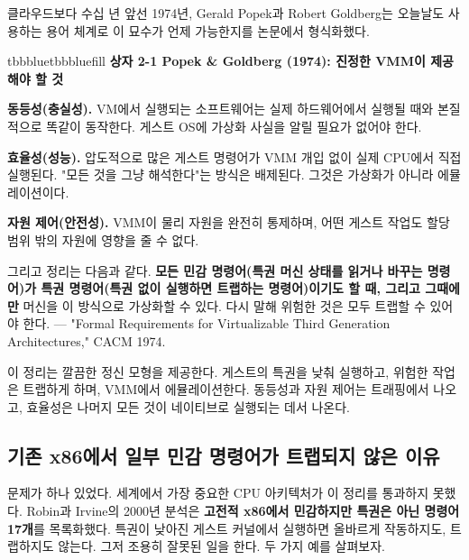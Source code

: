 클라우드보다 수십 년 앞선 1974년, Gerald Popek과 Robert Goldberg는 오늘날도 사용하는 용어 체계로 이 묘수가 언제 가능한지를 논문에서 형식화했다.

\begin{calloutbox}{tbbblue}{tbbbluefill}
{\normalsize\bfseries\color{tbbblue}상자 2-1  Popek \& Goldberg (1974): 진정한 VMM이 제공해야 할 것}\par\vspace{3pt}
\begin{tbbitemize}
  \item \textbf{동등성(충실성).} VM에서 실행되는 소프트웨어는 실제 하드웨어에서 실행될 때와 본질적으로 똑같이 동작한다. 게스트 OS에 가상화 사실을 알릴 필요가 없어야 한다.
  \item \textbf{효율성(성능).} 압도적으로 많은 게스트 명령어가 VMM 개입 없이 실제 CPU에서 직접 실행된다. "모든 것을 그냥 해석한다"는 방식은 배제된다. 그것은 가상화가 아니라 에뮬레이션이다.
  \item \textbf{자원 제어(안전성).} VMM이 물리 자원을 완전히 통제하며, 어떤 게스트 작업도 할당 범위 밖의 자원에 영향을 줄 수 없다.
\end{tbbitemize}

그리고 정리는 다음과 같다. \textbf{모든 민감 명령어(특권 머신 상태를 읽거나 바꾸는 명령어)가 특권 명령어(특권 없이 실행하면 트랩하는 명령어)이기도 할 때, 그리고 그때에만} 머신을 이 방식으로 가상화할 수 있다. 다시 말해 위험한 것은 모두 트랩할 수 있어야 한다. — "Formal Requirements for Virtualizable Third Generation Architectures," CACM 1974.
\end{calloutbox}

\vspace{3.0pt}

이 정리는 깔끔한 정신 모형을 제공한다. 게스트의 특권을 낮춰 실행하고, 위험한 작업은 트랩하게 하며, VMM에서 에뮬레이션한다. 동등성과 자원 제어는 트래핑에서 나오고, 효율성은 나머지 모든 것이 네이티브로 실행되는 데서 나온다.

\subsection*{기존 x86에서 일부 민감 명령어가 트랩되지 않은 이유}

문제가 하나 있었다. 세계에서 가장 중요한 CPU 아키텍처가 이 정리를 통과하지 못했다. Robin과 Irvine의 2000년 분석은 \textbf{고전적 x86에서 민감하지만 특권은 아닌 명령어 17개}를 목록화했다. 특권이 낮아진 게스트 커널에서 실행하면 올바르게 작동하지도, 트랩하지도 않는다. 그저 조용히 잘못된 일을 한다. 두 가지 예를 살펴보자.

